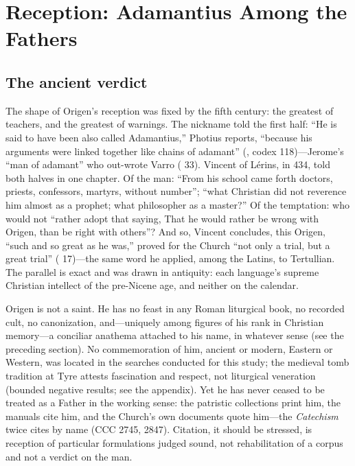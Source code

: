 \section{Reception: Adamantius Among the Fathers}

\subsection{The ancient verdict}

The shape of Origen's reception was fixed by the fifth century: the greatest
of teachers, and the greatest of warnings. The nickname told the first half:
``He is said to have been also called Adamantius,'' Photius reports,
``because his arguments were linked together like chains of adamant''
(, codex 118)---Jerome's ``man of adamant'' who out-wrote
Varro ( 33). Vincent of L\'erins, in 434, told both halves in
one chapter. Of the man: ``From his school came forth doctors, priests,
confessors, martyrs, without number''; ``what Christian did not reverence
him almost as a prophet; what philosopher as a master?'' Of the temptation:
who would not ``rather adopt that saying, That he would rather be wrong with
Origen, than be right with others''? And so, Vincent concludes, this Origen,
``such and so great as he was,'' proved for the Church ``not only a trial,
but a great trial'' ( 17)---the same word he applied,
among the Latins, to Tertullian. The parallel is exact and was drawn in
antiquity: each language's supreme Christian intellect of the pre-Nicene
age, and neither on the calendar.

Origen is not a saint. He has no feast in any Roman liturgical book, no
recorded cult, no canonization, and---uniquely among figures of his rank in
Christian memory---a conciliar anathema attached to his name, in whatever
sense (see the preceding section). No commemoration of him, ancient or
modern, Eastern or Western, was located in the searches conducted for this
study; the medieval tomb tradition at Tyre attests fascination and respect,
not liturgical veneration (bounded negative results; see the appendix). Yet
he has never ceased to be treated as a Father in the working sense: the
patristic collections print him, the manuals cite him, and the Church's own
documents quote him---the \textit{Catechism} twice cites 
by name (CCC 2745, 2847). Citation, it should be stressed, is reception of
particular formulations judged sound, not rehabilitation of a corpus and
not a verdict on the man.

